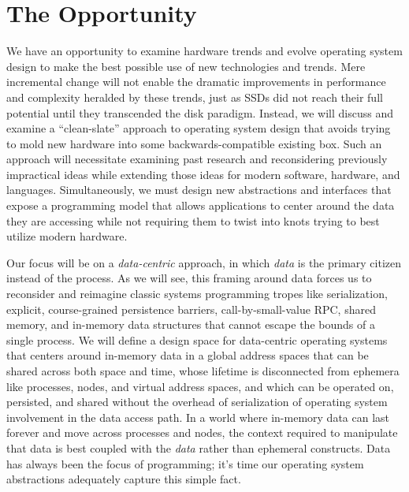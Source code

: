\section*{The Opportunity}


We have an opportunity to examine hardware trends and evolve operating system design to make the best possible use of
new technologies and trends. Mere incremental change will not enable the dramatic improvements in performance and
complexity heralded by these trends, just as SSDs did not reach their full potential
until they transcended the disk paradigm. Instead, we will discuss and examine a ``clean-slate'' approach to
operating system design that avoids trying to mold new hardware into some backwards-compatible existing
box. Such an
approach will necessitate examining past research and reconsidering previously impractical ideas while extending those
ideas for modern software, hardware, and languages. Simultaneously, we must design new abstractions and interfaces that
expose a programming model that allows applications to center around the data they are accessing while not requiring
them to twist into knots trying to best utilize modern hardware.

Our focus will be on a \emph{data-centric} approach, in which \emph{data} is the primary citizen instead of the process.
As we will see, this framing around data forces us to reconsider and reimagine classic systems programming tropes like serialization,
explicit, course-grained persistence barriers, call-by-small-value RPC, shared memory, and in-memory data structures
that cannot escape the bounds of a single process. We will define a design space for data-centric operating systems that
centers around in-memory data in a global address spaces that can be shared across both space and time, whose lifetime
is disconnected from ephemera like processes, nodes, and virtual address spaces, and which can be operated on,
persisted, and shared without the overhead of serialization of operating system involvement in the data access
path.
In a world where in-memory data can last forever and move across processes and nodes, the context required to manipulate
that data is best coupled with the \emph{data} rather than ephemeral constructs.
Data has always been the focus of programming; it's time our operating system abstractions adequately capture this
simple fact.


